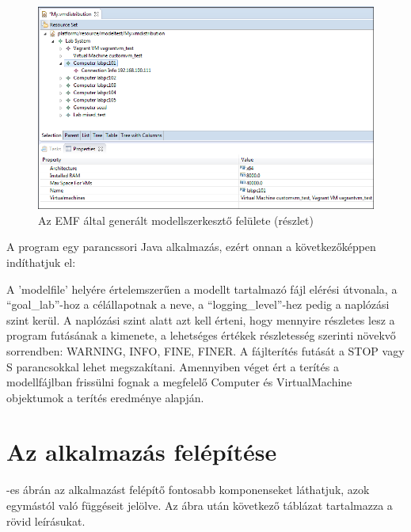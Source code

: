 \begin{figure}[ht]
\centering
\includegraphics[width=150mm, keepaspectratio]{figures/emfeditor.png}
\caption{Az EMF által generált modellszerkesztő felülete (részlet)}
\label{fig:emfeditor}
\end{figure}


A program egy parancssori Java alkalmazás, ezért onnan a következőképpen indíthatjuk el:


A 'modelfile' helyére értelemszerűen a modellt tartalmazó fájl elérési útvonala, a ``goal\_lab''-hoz a célállapotnak a neve, a ``logging\_level''-hez pedig a naplózási szint kerül. A naplózási szint alatt azt kell érteni, hogy mennyire részletes lesz a program futásának a kimenete, a lehetséges értékek részletesség szerinti növekvő sorrendben: WARNING, INFO, FINE, FINER.
A fájlterítés futását a STOP vagy S parancsokkal lehet megszakítani. Amennyiben véget ért a terítés a modellfájlban frissülni fognak a megfelelő Computer és VirtualMachine objektumok a terítés eredménye alapján.

\section{Az alkalmazás felépítése}
\label{impl_app}

-es ábrán az alkalmazást felépítő fontosabb komponenseket láthatjuk, azok egymástól való függéseit jelölve. Az ábra után következő táblázat tartalmazza a rövid leírásukat.

